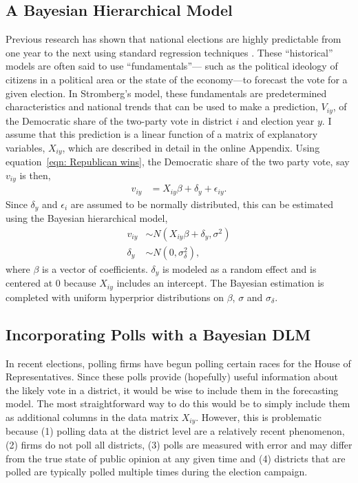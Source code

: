 \documentclass[12pt,final,fleqn]{article}
\theoremstyle{plain}
\begin{document}
\subsection{A Bayesian Hierarchical Model}
Previous research has shown that national elections are highly predictable from one year to the next using standard regression techniques \citep[e.g.][]{campbell1992forecasting, gelman1993american, kastellec2008predicting}. These ``historical'' models are often said to use ``fundamentals''--- such as the political ideology of citizens in a political area or the state of the economy---to forecast the vote for a given election. In Stromberg's model, these fundamentals are predetermined characteristics and national trends that can be used to make a prediction, $V_{iy}$, of the Democratic share of the two-party vote in district $i$ and election year $y$. I assume that this prediction is a linear function of a matrix of explanatory variables, $X_{iy}$, which are described in detail in the online Appendix. Using equation~\ref{eqn: Republican wins}, the Democratic share of the two party vote, say $v_{iy}$ is then,
\begin{align}
v_{iy}&= X_{iy}\beta + \delta_y + \epsilon_{iy}.
\end{align}
Since $\delta_y$ and $\epsilon_i$ are assumed to be normally distributed, this can be estimated using the Bayesian hierarchical model,
\begin{align}
v_{iy} &\sim N\left(X_{iy}\beta + \delta_y,  \sigma^2\right) \label{eqn: hierarchical linear model} \\
\delta_y &\sim N(0, \sigma^2_\delta), \label{eqn: hierarchical linear model time effects}
\end{align}
where $\beta$ is a vector of coefficients. $\delta_y$ is modeled as a random effect and is centered at 0 because $X_{iy}$ includes an intercept. The Bayesian estimation is completed  with uniform hyperprior distributions on $\beta$, $\sigma$ and $\sigma_\delta$.

\subsection{Incorporating Polls with a Bayesian DLM}
In recent elections, polling firms have begun polling certain races for the House of Representatives. Since these polls provide (hopefully) useful information about the likely vote in a district, it would be wise to include them in the forecasting model. The most straightforward way to do this would be to simply include them as additional columns in the data matrix $X_{iy}$. However, this is problematic because (1) polling data at the district level are a relatively recent phenomenon, (2) firms do not poll all districts, (3) polls are measured with error and may differ from the true state of public opinion at any given time and (4) districts that are polled are typically polled multiple times during the election campaign.
\end{document}
